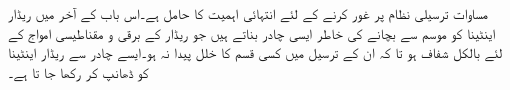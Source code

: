 مساوات  ترسیلی نظام پر غور کرنے کے لئے انتہائی اہمیت کا حامل ہے۔اس باب کے آخر میں ریڈار اینٹینا کو موسم  سے بچانے  کی خاطر ایسی چادر بناتے ہیں جو ریڈار کے برقی و مقناطیسی امواج کے لئے بالکل شفاف ہو تا کہ ان کے ترسیل میں کسی قسم کا خلل پیدا نہ ہو۔ایسے چادر سے ریڈار اینٹینا کو ڈھانپ کر رکھا جا تا ہے۔ 

